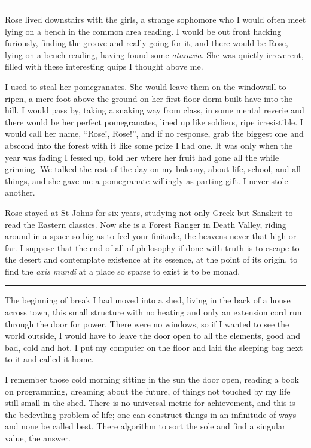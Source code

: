 \documentclass[ebook, 10pt, openright, onecolumn]{memoir}
\newcommand*\starbreak{\fancybreak*{\Large{* * *}}}
\begin{document}
\starbreak

Rose lived downstairs with the girls, a strange sophomore who I would often meet
lying on a bench in the common area reading.  I would be out front hacking
furiously, finding the groove and really going for it, and there would be Rose,
lying on a bench reading, having found some \textit{ataraxia}.  She was quietly
irreverent, filled with these interesting quips I thought above me.  

I used to steal her pomegranates.  She would leave them on the windowsill to
ripen, a mere foot above the ground on her first floor dorm built have into the
hill.  I would pass by, taking a snaking way from class, in some mental reverie
and there would be her perfect pomegranates, lined up like soldiers, ripe
irresistible.  I would call her name, ``Rose!, Rose!'', and if no response, grab
the biggest one and abscond into the forest with it like some prize I had one.
It was only when the year was fading I fessed up, told her where her fruit had
gone all the while grinning.  We talked the rest of the day on my balcony, about
life, school, and all things, and she gave me a pomegranate willingly as parting
gift.  I never stole another.

Rose stayed at St Johns for six years, studying not only Greek but Sanskrit to
read the Eastern classics.  Now she is a Forest Ranger in Death Valley, riding
around in a space so big as to feel your finitude, the heavens never that high
or far.  I suppose that the end of all of philosophy if done with truth is to
escape to the desert and contemplate existence at its essence, at the point of
its origin, to find the \textit{axis mundi} at a place so sparse to exist is to
be monad. 

\starbreak

The beginning of break I had moved into a shed, living in the back of a house
across town, this small structure with no heating and only an extension cord run
through the door for power.  There were no windows, so if I wanted to see the
world outside, I would have to leave the door open to all the elements, good and
bad, cold and hot.  I put my computer on the floor and laid the sleeping bag
next to it and called it home.

I remember those cold morning sitting in the sun the door open, reading a book
on programming, dreaming about the future, of things not touched by my life
still small in the shed.  There is no universal metric for achievement, and this
is the bedeviling problem of life; one can construct things in an infinitude of
ways and none be called best.  There algorithm to sort the sole and find a
singular value, the answer.  
\end{document}

